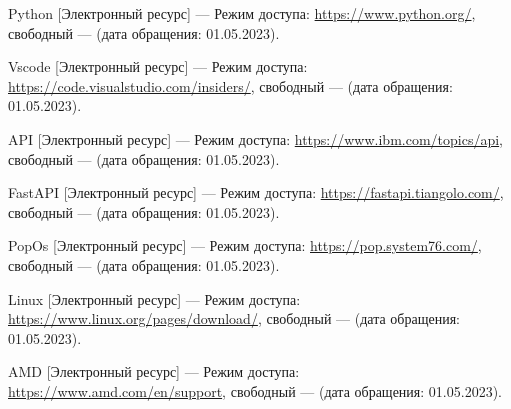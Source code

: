 \begin{thebibliography}{}
    Python [Электронный ресурс] --- Режим доступа:
    \url{https://www.python.org/}, свободный --- (дата обращения: 01.05.2023).

    Vscode [Электронный ресурс] --- Режим доступа:
    \url{https://code.visualstudio.com/insiders/}, свободный --- (дата обращения:
    01.05.2023).

    API [Электронный ресурс] --- Режим доступа:
    \url{https://www.ibm.com/topics/api}, свободный --- (дата обращения:
    01.05.2023).

    FastAPI [Электронный ресурс] --- Режим доступа:
    \url{https://fastapi.tiangolo.com/}, свободный --- (дата обращения:
    01.05.2023).

    PopOs [Электронный ресурс] --- Режим доступа: \url{https://pop.system76.com/}, свободный --- (дата обращения: 01.05.2023).

    Linux [Электронный ресурс] --- Режим доступа: \url{https://www.linux.org/pages/download/}, свободный --- (дата обращения: 01.05.2023).

    AMD [Электронный ресурс] --- Режим доступа: \url{https://www.amd.com/en/support}, свободный --- (дата обращения: 01.05.2023).
\end{thebibliography}
\endgroup

\pagebreak